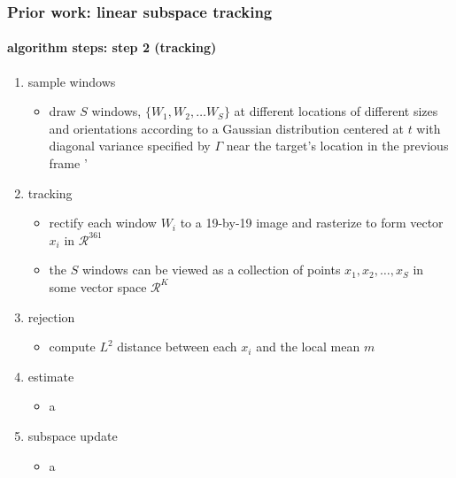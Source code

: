 \begin{frame}
\frametitle{Prior work: linear subspace tracking}
\framesubtitle{algorithm steps: step 2 (tracking)}
\logoCSIPCPL\mypagenum
	\begin{enumerate}
		\item {\color{blue} sample windows} 
			\begin{itemize}
				\item draw $S$ windows, $\{W_1, W_2, \ldots W_S\}$ at different locations of different sizes and orientations according to a Gaussian distribution centered at $t$ with diagonal variance specified by $\Gamma$ near the target's location in the previous frame
'			\end{itemize}
		\item {\color{blue} tracking}
			\begin{itemize}
				\item rectify each window $W_i$ to a 19-by-19 image and rasterize to form vector $x_i$ in $\mathcal{R}^{361}$
				\item the $S$ windows can be viewed as a collection of points $x_1, x_2, \ldots, x_S$ in some vector space $\mathcal{R}^K$
			\end{itemize} 
		\item {\color{blue} rejection}
			\begin{itemize}
				\item compute $L^2$ distance between each $x_i$ and the local mean $m$
			\end{itemize} 
		\item {\color{blue} estimate}
			\begin{itemize}
				\item a
			\end{itemize} 
		\item {\color{blue} subspace update}
			\begin{itemize}
				\item a
			\end{itemize} 
	\end{enumerate}
\end{frame}



